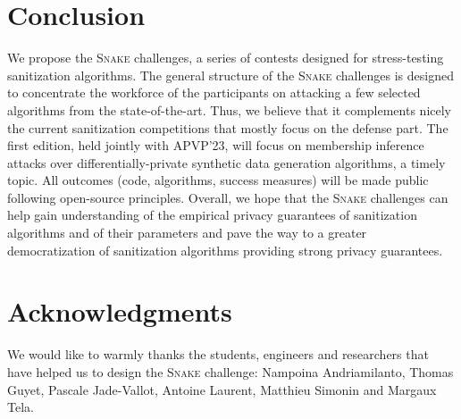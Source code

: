 \documentclass{article}
\newcommand{\name}{\textsc{Snake}\xspace}
\begin{document}
\section{Conclusion}
\label{sec:conclusion}
We propose the \name challenges, a series of contests designed for stress-testing sanitization algorithms.
The general structure of the \name challenges is designed to concentrate the workforce of the participants on attacking a few selected algorithms from the state-of-the-art.
Thus, we believe that it complements nicely the current sanitization competitions that mostly focus on the defense part.
The first edition, held jointly with APVP'23, will focus on membership inference attacks over differentially-private synthetic data generation algorithms, a timely topic.
All outcomes (code, algorithms, success measures) will be made public following open-source principles.
Overall, we hope that the \name challenges can help gain understanding of the empirical privacy guarantees of sanitization algorithms and of their parameters and pave the way to a greater democratization of sanitization algorithms providing strong privacy guarantees.


\section*{Acknowledgments}
We would like to warmly thanks the students, engineers and researchers that have helped us to design the \name{} challenge: Nampoina Andriamilanto, Thomas Guyet, Pascale Jade-Vallot, Antoine Laurent, Matthieu Simonin and Margaux Tela.

\printbibliography[title={References}]
\end{document}
